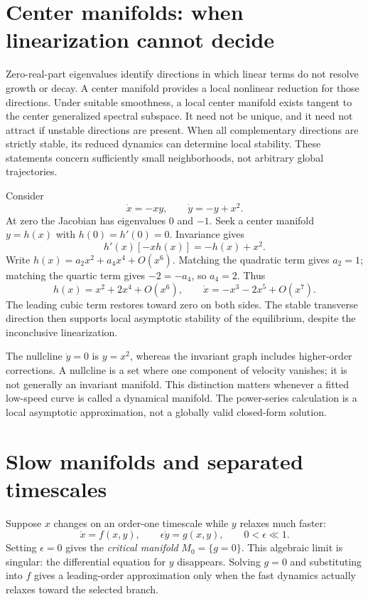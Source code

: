 \section{Center manifolds: when linearization cannot decide}
Zero-real-part eigenvalues identify directions in which linear terms do not resolve growth or decay. A center manifold provides a local nonlinear reduction for those directions. Under suitable smoothness, a local center manifold exists tangent to the center generalized spectral subspace. It need not be unique, and it need not attract if unstable directions are present. When all complementary directions are strictly stable, its reduced dynamics can determine local stability. These statements concern sufficiently small neighborhoods, not arbitrary global trajectories.

Consider
\begin{equation}\label{eq:center-example}
\dot x=-xy,\qquad \dot y=-y+x^2.
\end{equation}
At zero the Jacobian has eigenvalues $0$ and $-1$. Seek a center manifold $y=h(x)$ with $h(0)=h'(0)=0$. Invariance gives
\begin{equation}
h'(x)[-xh(x)]=-h(x)+x^2.
\end{equation}
Write $h(x)=a_2x^2+a_4x^4+O(x^6)$. Matching the quadratic term gives $a_2=1$; matching the quartic term gives $-2=-a_4$, so $a_4=2$. Thus
\begin{equation}
h(x)=x^2+2x^4+O(x^6),\qquad
\dot x=-x^3-2x^5+O(x^7).
\end{equation}
The leading cubic term restores toward zero on both sides. The stable transverse direction then supports local asymptotic stability of the equilibrium, despite the inconclusive linearization.

The nullcline $\dot y=0$ is $y=x^2$, whereas the invariant graph includes higher-order corrections. A nullcline is a set where one component of velocity vanishes; it is not generally an invariant manifold. This distinction matters whenever a fitted low-speed curve is called a dynamical manifold. The power-series calculation is a local asymptotic approximation, not a globally valid closed-form solution.

\section{Slow manifolds and separated timescales}
Suppose $x$ changes on an order-one timescale while $y$ relaxes much faster:
\begin{equation}\label{eq:slow-fast}
\dot x=f(x,y),\qquad \epsilon\dot y=g(x,y),\qquad0<\epsilon\ll1.
\end{equation}
Setting $\epsilon=0$ gives the \emph{critical manifold} $M_0=\{g=0\}$. This algebraic limit is singular: the differential equation for $y$ disappears. Solving $g=0$ and substituting into $f$ gives a leading-order approximation only when the fast dynamics actually relaxes toward the selected branch.

